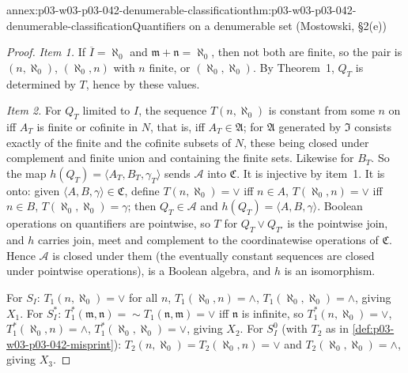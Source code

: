 \begin{annexitem}{annex:p03-w03-p03-042-denumerable-classification}{thm:p03-w03-p03-042-denumerable-classification}{Quantifiers on a denumerable set (Mostowski, \S2(e))}
\begin{proof}
\emph{Item 1.}  If \(\overline I=\aleph_0\) and
\(\mathfrak m+\mathfrak n=\aleph_0\), then not both are finite, so the pair
is \((n,\aleph_0)\), \((\aleph_0,n)\) with \(n\) finite, or
\((\aleph_0,\aleph_0)\).  By Theorem~1, \(Q_T\) is determined by \(T\),
hence by these values.

\emph{Item 2.}  For \(Q_T\) limited to \(I\), the sequence
\(T(n,\aleph_0)\) is constant from some \(n\) on iff \(A_T\) is finite or
cofinite in \(N\), that is, iff \(A_T\in\mathfrak A\); for \(\mathfrak A\)
generated by \(\mathfrak I\) consists exactly of the finite and the
cofinite subsets of \(N\), these being closed under complement and finite
union and containing the finite sets.  Likewise for \(B_T\).  So the map
\(h(Q_T)=\langle A_T,B_T,\gamma_T\rangle\) sends \(\mathcal A\) into
\(\mathfrak C\).  It is injective by item~1.  It is onto: given
\(\langle A,B,\gamma\rangle\in\mathfrak C\), define \(T(n,\aleph_0)=\vee\)
iff \(n\in A\), \(T(\aleph_0,n)=\vee\) iff \(n\in B\),
\(T(\aleph_0,\aleph_0)=\gamma\); then \(Q_T\in\mathcal A\) and
\(h(Q_T)=\langle A,B,\gamma\rangle\).  Boolean operations on quantifiers
are pointwise, so \(T\) for \(Q_T\vee Q_{T'}\) is the pointwise join, and
\(h\) carries join, meet and complement to the coordinatewise operations of
\(\mathfrak C\).  Hence \(\mathcal A\) is closed under them (the
eventually constant sequences are closed under pointwise operations), is a
Boolean algebra, and \(h\) is an isomorphism.

For \(S_I\): \(T_1(n,\aleph_0)=\vee\) for all \(n\), \(T_1(\aleph_0,n)=
\wedge\), \(T_1(\aleph_0,\aleph_0)=\wedge\), giving \(X_1\).  For
\(S^{*}_I\): \(T_1^{*}(\mathfrak m,\mathfrak n)={\sim}T_1(\mathfrak n,
\mathfrak m)=\vee\) iff \(\mathfrak n\) is infinite, so \(T_1^{*}(n,\aleph_0)=\vee\),
\(T_1^{*}(\aleph_0,n)=\wedge\), \(T_1^{*}(\aleph_0,\aleph_0)=\vee\), giving
\(X_2\).  For \(S^0_I\) (with \(T_2\) as in
\cref{def:p03-w03-p03-042-misprint}): \(T_2(n,\aleph_0)=T_2(\aleph_0,n)=
\vee\) and \(T_2(\aleph_0,\aleph_0)=\wedge\), giving \(X_3\).


\end{proof}
\end{annexitem}
